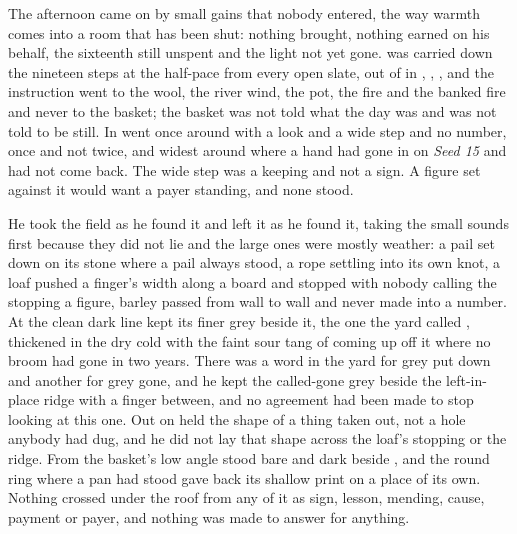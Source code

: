 The afternoon came on by small gains that nobody entered, the way warmth comes into a room that has been shut: nothing brought, nothing earned on his behalf, the sixteenth still unspent and the light not yet gone.  was carried down the nineteen steps at the half-pace from every open slate, out of  in , , , and the instruction went to the wool, the river wind, the pot, the fire and the banked fire and never to the basket; the basket was not told what the day was and was not told to be still. In   went once around  with a look and a wide step and no number, once and not twice, and widest around  where a hand had gone in on \emph{Seed 15} and had not come back. The wide step was a keeping and not a sign. A figure set against it would want a payer standing, and none stood.

He took the field as he found it and left it as he found it, taking the small sounds first because they did not lie and the large ones were mostly weather: a pail set down on its stone where a pail always stood, a rope settling into its own knot, a loaf pushed a finger's width along a board and stopped with nobody calling the stopping a figure, barley passed from wall to wall and never made into a number. At  the clean dark line kept its finer grey beside it, the one the yard called , thickened in the dry cold with the faint sour tang of  coming up off it where no broom had gone in two years. There was a word in the yard for grey put down and another for grey gone, and he kept the called-gone grey beside the left-in-place ridge with a finger between, and no agreement had been made to stop looking at this one. Out on   held the shape of a thing taken out, not a hole anybody had dug, and he did not lay that shape across the loaf's stopping or the ridge. From the basket's low angle  stood bare and dark beside , and the round ring where a pan had stood gave back its shallow print on a place of its own. Nothing crossed under the roof from any of it as sign, lesson, mending, cause, payment or payer, and nothing was made to answer for anything.

